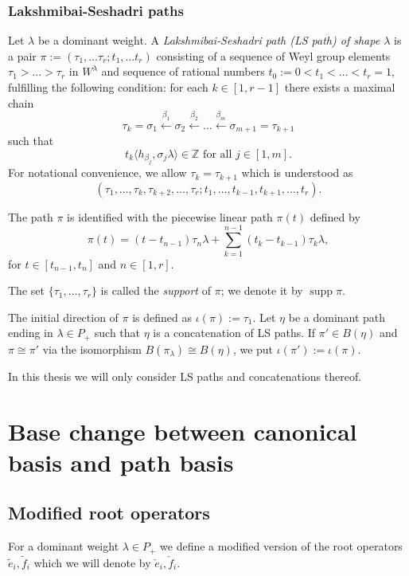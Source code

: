 \documentclass[final]{amsart}
\theoremstyle{plain}
\theoremstyle{definition}
\newcommand{\bbZ}{\mathbb Z}
\newcommand{\te}{\tilde e}
\newcommand{\tf}{\tilde f}
\newcommand{\cf}{\check{f}}
\newcommand{\ce}{\check{e}}
\DeclareMathOperator{\supp}{supp}
\begin{document}
\subsubsection*{Lakshmibai-Seshadri paths}
Let $\lambda$ be a dominant weight.
A \emph{Lakshmibai-Seshadri path (LS path) of shape $\lambda$} is a pair $\pi := (\tau_1, \dots \tau_r; t_1, \dots t_r)$ consisting of a sequence of Weyl group elements $\tau_1 > \ldots > \tau_r$ in $W^\lambda$ and sequence of rational numbers $t_0 := 0 < t_1 < \dots < t_r = 1$, fulfilling the following condition:
for each $k \in [1, r-1]$ there exists a maximal chain
\[
    \tau_k = \sigma_1 \xleftarrow{\beta_1} \sigma_2 \xleftarrow{\beta_2} \dots \xleftarrow{\beta_m} \sigma_{m+1} = \tau_{k+1}
\]
such that
\[
    t_k \langle h_{\beta_j}, \sigma_j \lambda \rangle \in \bbZ \text{ for all } j \in [1, m].
\]
For notational convenience, we allow $\tau_k = \tau_{k+1}$ which is understood as
\[
    (\tau_1, \dots, \tau_k, \tau_{k+2}, \dots, \tau_r; t_1, \dots, t_{k-1}, t_{k+1}, \dots, t_r).
\]

The path $\pi$ is identified with the piecewise linear path $\pi(t)$ defined by
\[
    \pi(t) = (t - t_{n-1}) \tau_n\lambda +  \sum_{k=1}^{n-1} (t_k - t_{k-1}) \tau_k\lambda,
\]
for $t \in [t_{n-1}, t_n]$ and $n \in [1, r]$.

The set $\{ \tau_1, \dots, \tau_r \}$ is called the \emph{support} of $\pi$; we denote it by $\supp \pi$.

The initial direction of $\pi$ is defined as $\iota(\pi) := \tau_1$.
Let $\eta$ be a dominant path ending in $\lambda \in P_+$ such that $\eta$ is a concatenation of LS paths.
If $\pi' \in B(\eta)$ and $\pi \cong \pi'$ via the isomorphism $B(\pi_\lambda) \cong B(\eta)$, we put $\iota(\pi') := \iota(\pi)$.

In this thesis we will only consider LS paths and concatenations thereof.

\section{Base change between canonical basis and path basis}
\label{section:base-change}

\subsection{Modified root operators}
\label{section:modified-root-operators}

For a dominant weight $\lambda \in P_+$ we define a modified version of the root operators $\te_i, \tf_i$ which we will denote by $\ce_i, \cf_i$.
\end{document}
